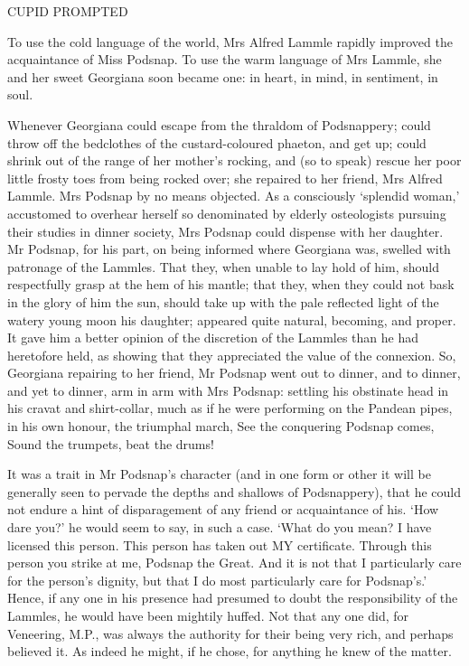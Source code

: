 CUPID PROMPTED


To use the cold language of the world, Mrs Alfred Lammle rapidly
improved the acquaintance of Miss Podsnap. To use the warm language of
Mrs Lammle, she and her sweet Georgiana soon became one: in heart, in
mind, in sentiment, in soul.

Whenever Georgiana could escape from the thraldom of Podsnappery; could
throw off the bedclothes of the custard-coloured phaeton, and get up;
could shrink out of the range of her mother’s rocking, and (so to speak)
rescue her poor little frosty toes from being rocked over; she repaired
to her friend, Mrs Alfred Lammle. Mrs Podsnap by no means objected. As
a consciously ‘splendid woman,’ accustomed to overhear herself so
denominated by elderly osteologists pursuing their studies in dinner
society, Mrs Podsnap could dispense with her daughter. Mr Podsnap, for
his part, on being informed where Georgiana was, swelled with patronage
of the Lammles. That they, when unable to lay hold of him, should
respectfully grasp at the hem of his mantle; that they, when they could
not bask in the glory of him the sun, should take up with the pale
reflected light of the watery young moon his daughter; appeared quite
natural, becoming, and proper. It gave him a better opinion of the
discretion of the Lammles than he had heretofore held, as showing that
they appreciated the value of the connexion. So, Georgiana repairing
to her friend, Mr Podsnap went out to dinner, and to dinner, and yet to
dinner, arm in arm with Mrs Podsnap: settling his obstinate head in his
cravat and shirt-collar, much as if he were performing on the Pandean
pipes, in his own honour, the triumphal march, See the conquering
Podsnap comes, Sound the trumpets, beat the drums!

It was a trait in Mr Podsnap’s character (and in one form or other
it will be generally seen to pervade the depths and shallows of
Podsnappery), that he could not endure a hint of disparagement of any
friend or acquaintance of his. ‘How dare you?’ he would seem to say, in
such a case. ‘What do you mean? I have licensed this person. This person
has taken out MY certificate. Through this person you strike at me,
Podsnap the Great. And it is not that I particularly care for the
person’s dignity, but that I do most particularly care for Podsnap’s.’
Hence, if any one in his presence had presumed to doubt the
responsibility of the Lammles, he would have been mightily huffed. Not
that any one did, for Veneering, M.P., was always the authority for
their being very rich, and perhaps believed it. As indeed he might, if
he chose, for anything he knew of the matter.

